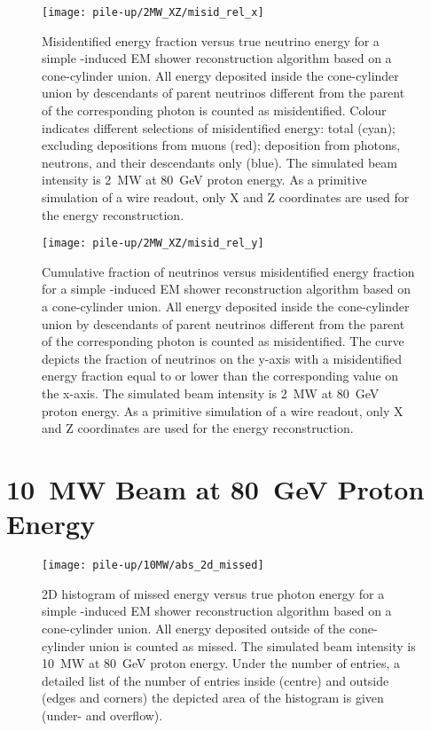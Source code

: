 \begin{figure}[htb]
	\centering
	\texttt{[image: pile-up/2MW\_XZ/misid\_rel\_x]}
	\caption{Misidentified energy fraction versus true neutrino energy for a simple \Pgpz-induced EM shower reconstruction algorithm based on a cone-cylinder union.
		All energy deposited inside the cone-cylinder union by descendants of parent neutrinos different from the parent of the corresponding \Pgpz photon is counted as misidentified.
		Colour indicates different selections of misidentified energy: total (cyan); excluding depositions from muons (red); deposition from photons, neutrons, and their descendants only (blue).
		The simulated beam intensity is \SI{2}{\mega\watt} at \SI{80}{\giga\electronvolt} proton energy.
		As a primitive simulation of a wire readout, only X and Z coordinates are used for the energy reconstruction.}
\end{figure}

\begin{figure}[htb]
	\centering
	\texttt{[image: pile-up/2MW\_XZ/misid\_rel\_y]}
	\caption{Cumulative fraction of neutrinos versus misidentified energy fraction for a simple \Pgpz-induced EM shower reconstruction algorithm based on a cone-cylinder union.
		All energy deposited inside the cone-cylinder union by descendants of parent neutrinos different from the parent of the corresponding \Pgpz photon is counted as misidentified.
		The curve depicts the fraction of neutrinos on the y-axis with a misidentified energy fraction equal to or lower than the corresponding value on the x-axis.
		The simulated beam intensity is \SI{2}{\mega\watt} at \SI{80}{\giga\electronvolt} proton energy.
		As a primitive simulation of a wire readout, only X and Z coordinates are used for the energy reconstruction.}
\end{figure}

\clearpage

\section{\SI{10}{\mega\watt} Beam at \SI{80}{\giga\electronvolt} Proton Energy}

\begin{figure}[htb]
	\centering
	\texttt{[image: pile-up/10MW/abs\_2d\_missed]}
	\caption{2D histogram of missed energy versus true photon energy for a simple \Pgpz-induced EM shower reconstruction algorithm based on a cone-cylinder union.
		All energy deposited outside of the cone-cylinder union is counted as missed.
		The simulated beam intensity is \SI{10}{\mega\watt} at \SI{80}{\giga\electronvolt} proton energy.
		Under the number of entries, a detailed list of the number of entries inside (centre) and outside (edges and corners) the depicted area of the histogram is given (under- and overflow).}
\end{figure}

